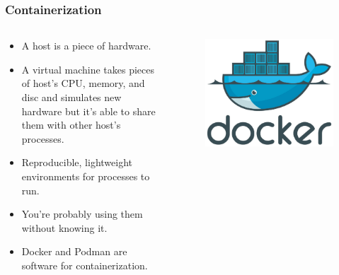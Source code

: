 \documentclass[aspectratio=169]{beamer}
\begin{document}
\begin{frame}
\begin{columns}
\begin{column}{0.5\textwidth}
\begin{figure}
            \end{figure}
        \end{column}
    \end{columns}
\end{frame}

\begin{frame}
    \frametitle{Containerization}
    \begin{columns}
        \begin{column}{0.5\textwidth}
            \begin{itemize}
                \item A host is a piece of hardware.
                \item A virtual machine takes pieces of host's CPU, memory, and
                    disc and simulates new hardware but it's able to share them
                    with other host's processes.
                \item Reproducible, lightweight environments for processes to
                    run.
                \item You're probably using them without knowing it.
                \item Docker and Podman are software for containerization.
            \end{itemize}
        \end{column}
        \begin{column}{0.5\textwidth}
            \begin{figure}
                \centering
                \includegraphics[scale=0.25]{logos/docker-logo.jpg}

\end{figure}
\end{column}
\end{columns}
\end{frame}
\end{document}
